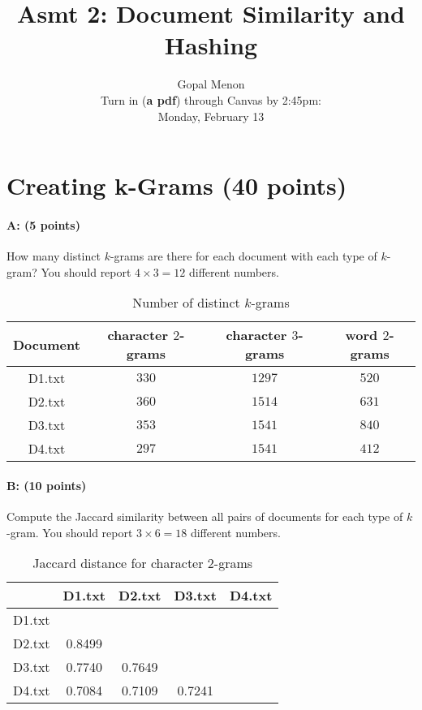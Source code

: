 \documentclass[11pt]{article}
\title{Asmt 2: Document Similarity and Hashing}
\author{Gopal Menon\\Turn in (\textbf{a pdf}) through Canvas by 2:45pm: \\
Monday, February 13}
\date{}
\begin{document}
\maketitle



\section{Creating k-Grams (40 points)}

\paragraph{A: (5 points)} 
How many distinct $k$-grams are there for each document with each type of $k$-gram? You
should report $4 \times 3 = 12$ different numbers.

    \begin{table}[!h] 
    \centering
    \caption{Number of distinct $k$-grams}
    \begin{tabular}{|c|c|c|c|}
      \hline
   Document  & character $2$-grams &  character $3$-grams & word $2$-grams  \\
      \hline      
      D1.txt &   $330$              &  $1297$  &          $520$                          \\
      \hline      
      D2.txt &    $360$             & $1514$   &           $631$                         \\
      \hline      
      D3.txt &    $353$           &  $1541$  &             $840$                       \\
      \hline      
      D4.txt &      $297$          &  $1541$  &             $412$                       \\
      \hline
    \end{tabular}
    \end{table}

\paragraph{B: (10 points)}  
Compute the Jaccard similarity between all pairs of documents for each type of $k$-gram.
You should report $3 \times 6 = 18$ different numbers.

\begin{table}[!ht]  
  \centering
  \caption{Jaccard distance for character $2$-grams}
  \begin{tabular}{|c|c|c|c|c|}
    \cline{2-5}
    \multicolumn{1}{c|}{} & D1.txt & D2.txt & D3.txt & D4.txt\\ \hline
    D1.txt &    &    &   & \\ \hline
    D2.txt & 0.8499   &    &   & \\ \hline
    D3.txt & 0.7740   & 0.7649   &   & \\ \hline
    D4.txt & 0.7084  & 0.7109  & 0.7241 & \\ \hline
  \end{tabular}
  \end{table}
\end{document}
